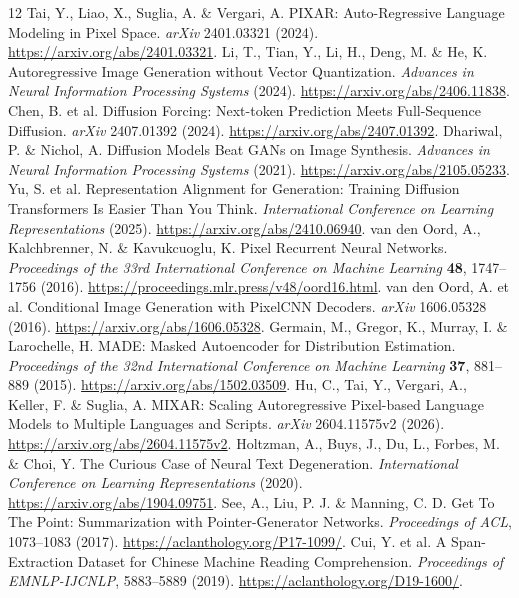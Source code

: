 \begin{thebibliography}{12}
 Tai, Y., Liao, X., Suglia, A. \& Vergari, A. PIXAR: Auto-Regressive Language Modeling in Pixel Space. \emph{arXiv} 2401.03321 (2024). \url{https://arxiv.org/abs/2401.03321}.
 Li, T., Tian, Y., Li, H., Deng, M. \& He, K. Autoregressive Image Generation without Vector Quantization. \emph{Advances in Neural Information Processing Systems} (2024). \url{https://arxiv.org/abs/2406.11838}.
 Chen, B. et al. Diffusion Forcing: Next-token Prediction Meets Full-Sequence Diffusion. \emph{arXiv} 2407.01392 (2024). \url{https://arxiv.org/abs/2407.01392}.
 Dhariwal, P. \& Nichol, A. Diffusion Models Beat GANs on Image Synthesis. \emph{Advances in Neural Information Processing Systems} (2021). \url{https://arxiv.org/abs/2105.05233}.
 Yu, S. et al. Representation Alignment for Generation: Training Diffusion Transformers Is Easier Than You Think. \emph{International Conference on Learning Representations} (2025). \url{https://arxiv.org/abs/2410.06940}.
 van den Oord, A., Kalchbrenner, N. \& Kavukcuoglu, K. Pixel Recurrent Neural Networks. \emph{Proceedings of the 33rd International Conference on Machine Learning} \textbf{48}, 1747--1756 (2016). \url{https://proceedings.mlr.press/v48/oord16.html}.
 van den Oord, A. et al. Conditional Image Generation with PixelCNN Decoders. \emph{arXiv} 1606.05328 (2016). \url{https://arxiv.org/abs/1606.05328}.
 Germain, M., Gregor, K., Murray, I. \& Larochelle, H. MADE: Masked Autoencoder for Distribution Estimation. \emph{Proceedings of the 32nd International Conference on Machine Learning} \textbf{37}, 881--889 (2015). \url{https://arxiv.org/abs/1502.03509}.
 Hu, C., Tai, Y., Vergari, A., Keller, F. \& Suglia, A. MIXAR: Scaling Autoregressive Pixel-based Language Models to Multiple Languages and Scripts. \emph{arXiv} 2604.11575v2 (2026). \url{https://arxiv.org/abs/2604.11575v2}.
 Holtzman, A., Buys, J., Du, L., Forbes, M. \& Choi, Y. The Curious Case of Neural Text Degeneration. \emph{International Conference on Learning Representations} (2020). \url{https://arxiv.org/abs/1904.09751}.
 See, A., Liu, P. J. \& Manning, C. D. Get To The Point: Summarization with Pointer-Generator Networks. \emph{Proceedings of ACL}, 1073--1083 (2017). \url{https://aclanthology.org/P17-1099/}.
 Cui, Y. et al. A Span-Extraction Dataset for Chinese Machine Reading Comprehension. \emph{Proceedings of EMNLP-IJCNLP}, 5883--5889 (2019). \url{https://aclanthology.org/D19-1600/}.
\end{thebibliography}
